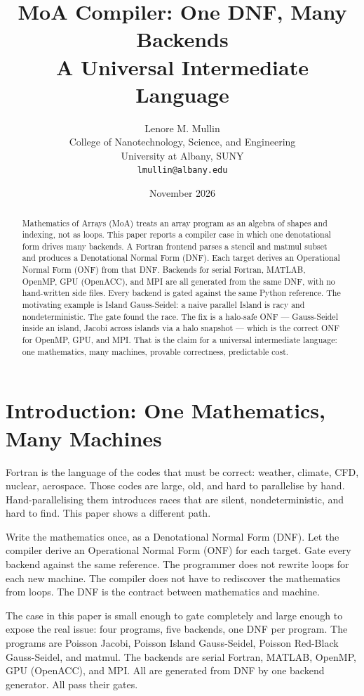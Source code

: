 \documentclass[11pt]{article}
\title{MoA Compiler: One DNF, Many Backends\\A Universal Intermediate Language}
\author{Lenore M. Mullin\\College of Nanotechnology, Science, and Engineering\\University at Albany, SUNY\\{\tt lmullin@albany.edu}}
\date{November 2026}
\begin{document}
\maketitle
\begin{abstract}
Mathematics of Arrays (MoA) treats an array program as an algebra of shapes
and indexing, not as loops. This paper reports a compiler case in which one
denotational form drives many backends. A Fortran frontend parses a stencil
and matmul subset and produces a Denotational Normal Form (DNF). Each target
derives an Operational Normal Form (ONF) from that DNF. Backends for serial
Fortran, MATLAB, OpenMP, GPU (OpenACC), and MPI are all generated from the
same DNF, with no hand-written side files. Every backend is gated against the
same Python reference. The motivating example is Island Gauss-Seidel: a naive
parallel Island is racy and nondeterministic. The gate found the race. The
fix is a halo-safe ONF --- Gauss-Seidel inside an island, Jacobi across
islands via a halo snapshot --- which is the correct ONF for OpenMP, GPU, and
MPI. That is the claim for a universal intermediate language: one mathematics,
many machines, provable correctness, predictable cost.
\end{abstract}

\section{Introduction: One Mathematics, Many Machines}
Fortran is the language of the codes that must be correct: weather, climate,
CFD, nuclear, aerospace. Those codes are large, old, and hard to parallelise
by hand. Hand-parallelising them introduces races that are silent,
nondeterministic, and hard to find. This paper shows a different path.

Write the mathematics once, as a Denotational Normal Form (DNF). Let the
compiler derive an Operational Normal Form (ONF) for each target. Gate every
backend against the same reference. The programmer does not rewrite loops
for each new machine. The compiler does not have to rediscover the
mathematics from loops. The DNF is the contract between mathematics and
machine.

The case in this paper is small enough to gate completely and large enough
to expose the real issue: four programs, five backends, one DNF per program.
The programs are Poisson Jacobi, Poisson Island Gauss-Seidel, Poisson
Red-Black Gauss-Seidel, and matmul. The backends are serial Fortran, MATLAB,
OpenMP, GPU (OpenACC), and MPI. All are generated from DNF by one backend
generator. All pass their gates.
\end{document}
